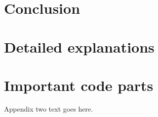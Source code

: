 \documentclass[journal]{IEEEtran}
\begin{document}
\section{Conclusion}

\appendices

\section{Detailed explanations}
%

\section{Important code parts}
Appendix two text goes here.




\end{document}

